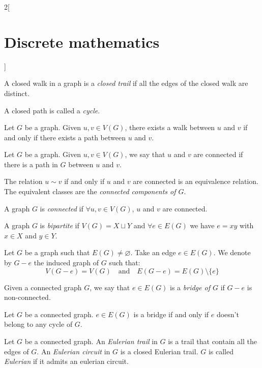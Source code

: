 \documentclass[../../../main.tex]{subfiles}
\begin{document}
\begin{multicols}{2}[\section{Discrete mathematics}]
  \begin{definition}
    A closed walk in a graph is a \textit{closed trail} if all the edges of the closed walk are distinct.
  \end{definition}
  \begin{definition}
    A closed path is called a \textit{cycle}.
  \end{definition}
  \begin{prop}
    Let $G$ be a graph. Given $u,v\in V(G)$, there exists a walk between $u$ and $v$ if and only if there exists a path between $u$ and $v$.
  \end{prop}
  \begin{definition}
    Let $G$ be a graph. Given $u,v\in V(G)$, we say that $u$ and $v$ are connected if there is a path in $G$ between $u$ and $v$.
  \end{definition}
  \begin{prop}
    The relation $u\sim v$ if and only if $u$ and $v$ are connected is an equivalence relation. The equivalent classes are the \textit{connected components of $G$}.
  \end{prop}
  \begin{definition}
    A graph $G$ is \textit{connected} if $\forall u,v\in V(G)$, $u$ and $v$ are connected.
  \end{definition}
  \begin{definition}
    A graph $G$ is \textit{bipartite} if $V(G)=X\sqcup Y$ and $\forall e\in E(G)$ we have $e=xy$ with $x\in X$ and $y\in Y$.
  \end{definition}
  \begin{definition}
    Let $G$ be a graph such that $E(G)\ne\varnothing$. Take an edge $e\in E(G)$. We denote by $G-e$ the induced graph of $G$ such that: $$V(G-e)=V(G)\quad\text{and}\quad E(G-e)=E(G)\setminus\{e\}$$
  \end{definition}
  \begin{definition}
    Given a connected graph $G$, we say that $e\in E(G)$ is a \textit{bridge of $G$} if $G-e$ is non-connected.
  \end{definition}
  \begin{prop}
    Let $G$ be a connected graph. $e\in E(G)$ is a bridge if and only if $e$ doesn't belong to any cycle of $G$.
  \end{prop}
  \begin{definition}
    Let $G$ be a connected graph. An \textit{Eulerian trail} in $G$ is a trail that contain all the edges of $G$. An \textit{Eulerian circuit} in $G$ is a closed Eulerian trail. $G$ is called \textit{Eulerian} if it admits an eulerian circuit.

\end{definition}
\end{multicols}
\end{document}
